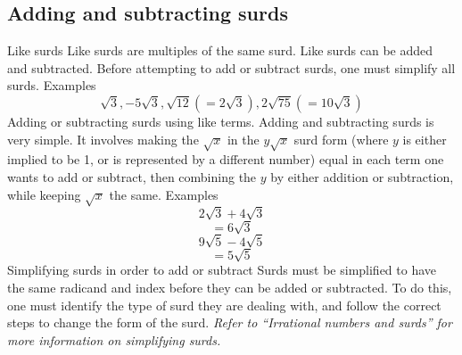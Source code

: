 \begin{outline}
\subsection{Adding and subtracting surds}
	\1 Like surds
	 	\2 Like surds are multiples of the same surd. Like surds can be added and subtracted. Before attempting to add or subtract surds, one must simplify all surds.
	 	 	\3 Examples
	 	 	 	\[\sqrt{3}, -5\sqrt{3}, \sqrt{12} (= 2\sqrt{3}), 2\sqrt{75} (= 10\sqrt{3})\]
	\1 Adding or subtracting surds using like terms.
	 	\2 Adding and subtracting surds is very simple. It involves making the $\sqrt{x}$ in the $y\sqrt{x}$ surd form (where $y$ is either implied to be 1, or is represented by a different number) equal in each term one wants to add or subtract, then combining the $y$ by either addition or subtraction, while keeping $\sqrt{x}$ the same.
	 	 	\3 Examples
	 	 	 	\[2\sqrt{3} + 4\sqrt{3}\]
	 	 	 	\[= 6\sqrt{3}\]
	 	 	 	\[\]
	 	 	 	\[9\sqrt{5} - 4\sqrt{5}\]
	 	 	 	\[= 5\sqrt{5}\]
	\1 Simplifying surds in order to add or subtract
	 	\2 Surds must be simplified to have the same radicand and index before they can be added or subtracted. To do this, one must identify the type of surd they are dealing with, and follow the correct steps to change the form of the surd. \textit{Refer to ``Irrational numbers and surds'' for more information on simplifying surds.}

\0

\end{outline}
